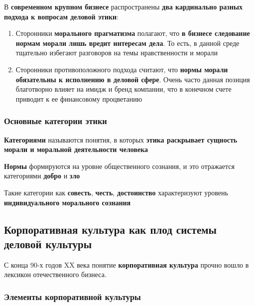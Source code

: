 \documentclass{article}
\begin{document}
В \textbf{современном крупном бизнесе} распространены \textbf{два кардинально разных подхода к вопросам деловой этики}:

\begin{enumerate}
    \item Сторонники \textbf{морального прагматизма} полагают, что \textbf{в бизнесе следование нормам морали лишь вредит интересам дела}. То есть, в данной среде тщательно избегают разговоров на темы нравственности и морали
    \item Сторонники противоположного подхода считают, что \textbf{нормы морали обязательны к исполнению в деловой сфере}. Очень часто данная позиция благотворно влияет на имидж и бренд компании, что в конечном счете приводит к ее финансовому процветанию
\end{enumerate}

\subsubsection{Основные категории этики}

\begin{multienumerate}
\end{multienumerate}

\textbf{Категориями} называются понятия, в которых \textbf{этика раскрывает сущность морали и моральной деятельности человека}

\textbf{Нормы} формируются на уровне общественного сознания, и это отражается категориями \textbf{добро} и \textbf{зло}

Такие категории как \textbf{совесть}, \textbf{честь}, \textbf{достоинство} характеризуют уровень \textbf{индивидуального морального сознания}

\subsection{Корпоративная культура как плод системы деловой культуры}

С конца 90-х годов XX века понятие \textbf{корпоративная культура} прочно вошло в лексикон отечественного бизнеса.

\subsubsection{Элементы корпоративной культуры}
\end{document}
